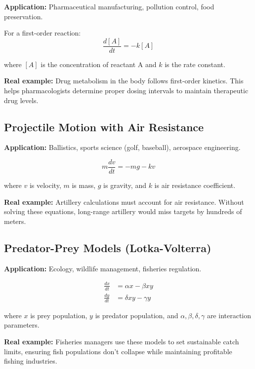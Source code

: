\documentclass{article}
\begin{document}
\textbf{Application:} Pharmaceutical manufacturing, pollution control, food preservation.

For a first-order reaction:
\begin{equation}
\frac{d[A]}{dt} = -k[A]
\end{equation}

where $[A]$ is the concentration of reactant A and $k$ is the rate constant.

\textbf{Real example:} Drug metabolism in the body follows first-order kinetics. This helps pharmacologists determine proper dosing intervals to maintain therapeutic drug levels.

\subsection{Projectile Motion with Air Resistance}

\textbf{Application:} Ballistics, sports science (golf, baseball), aerospace engineering.

\begin{equation}
m\frac{dv}{dt} = -mg - kv
\end{equation}

where $v$ is velocity, $m$ is mass, $g$ is gravity, and $k$ is air resistance coefficient.

\textbf{Real example:} Artillery calculations must account for air resistance. Without solving these equations, long-range artillery would miss targets by hundreds of meters.

\subsection{Predator-Prey Models (Lotka-Volterra)}

\textbf{Application:} Ecology, wildlife management, fisheries regulation.

\begin{align}
\frac{dx}{dt} &= \alpha x - \beta xy\\
\frac{dy}{dt} &= \delta xy - \gamma y
\end{align}

where $x$ is prey population, $y$ is predator population, and $\alpha, \beta, \delta, \gamma$ are interaction parameters.

\textbf{Real example:} Fisheries managers use these models to set sustainable catch limits, ensuring fish populations don't collapse while maintaining profitable fishing industries.
\end{document}
